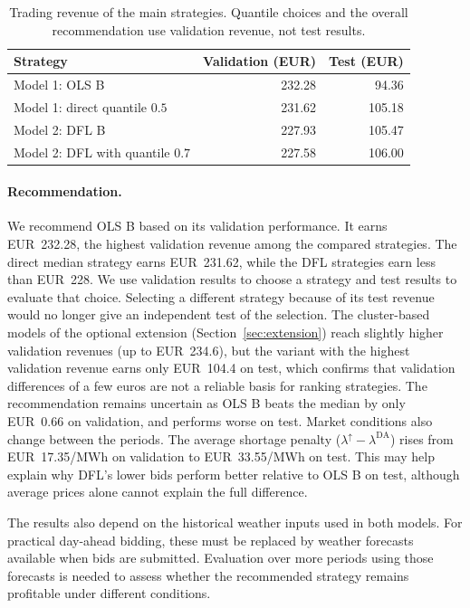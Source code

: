 \begin{table}[htbp]
 \centering
 \caption{Trading revenue of the main strategies. Quantile choices and
 the overall recommendation use validation revenue, not test results.}
 \label{tab:model2-overall}
 \begin{tabular}{lrr}
 \hline
 Strategy & Validation (EUR) & Test (EUR)\\
 \hline
 Model 1: OLS B & 232.28 & 94.36\\
 Model 1: direct quantile $0.5$ & 231.62 & 105.18\\
 Model 2: DFL B & 227.93 & 105.47\\
 Model 2: DFL with quantile $0.7$ & 227.58 & 106.00\\
 \hline
 \end{tabular}
\end{table}

\paragraph{Recommendation.}
We recommend OLS B based on its validation performance. It earns
EUR~232.28, the highest validation revenue among the compared strategies.
The direct median strategy earns EUR~231.62, while the DFL strategies
earn less than EUR~228. We use validation results to choose a strategy
and test results to evaluate that choice. Selecting a different strategy
because of its test revenue would no longer give an independent test
of the selection.
The cluster-based models of the optional extension (Section~\ref{sec:extension}) reach slightly higher validation revenues (up to EUR~234.6), but the variant with the highest validation revenue earns only EUR~104.4 on test, which confirms that validation differences of a few euros are not a reliable basis for ranking strategies.
The recommendation remains uncertain as OLS B beats the median by only
EUR~0.66 on validation, and performs worse on test. Market conditions
also change between the periods. The average shortage penalty
($\lambda^{\uparrow}-\lambda^{\mathrm{DA}}$) rises from EUR~17.35/MWh
on validation to EUR~33.55/MWh on test. This may help explain why DFL's
lower bids perform better relative to OLS B on test, although average
prices alone cannot explain the full difference.

The results also depend on the historical weather inputs used in both
models. For practical day-ahead bidding, these must be replaced by
weather forecasts available when bids are submitted. Evaluation over
more periods using those forecasts is needed to assess whether the
recommended strategy remains profitable under different conditions.

